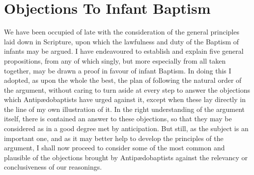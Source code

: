 \documentclass[english,]{book}
\begin{document}
\hypertarget{objections-to-infant-baptism}{%
\section{Objections To Infant Baptism}\label{objections-to-infant-baptism}}

We have been occupied of late with the consideration of the general principles laid down in Scripture, upon which the lawfulness and duty of the Baptism of infants may be argued. I have endeavoured to establish and explain five general propositions, from any of which singly, but more especially from all taken together, may be drawn a proof in favour of infant Baptism. In doing this I adopted, as upon the whole the best, the plan of following the natural order of the argument, without caring to turn aside at every step to answer the objections which Antipædobaptists have urged against it, except when these lay directly in the line of my own illustration of it. In the right understanding of the argument itself, there is contained an answer to these objections, so that they may be considered as in a good degree met by anticipation. But still, as the subject is an important one, and as it may better help to develop the principles of the argument, I shall now proceed to consider some of the most common and plausible of the objections brought by Antipædobaptists against the relevancy or conclusiveness of our reasonings.
\end{document}
